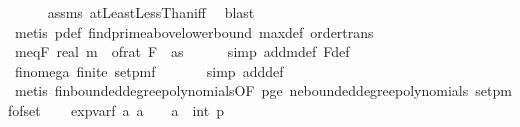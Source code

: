\begin{isabellebody}
\ \ \ \ \isamarkupfalse%
\ assms{\isacharparenleft}{\kern0pt}{}{\isacharparenright}{\kern0pt}\ atLeastLessThan{\isacharunderscore}{\kern0pt}iff\ \isamarkupfalse%
\ blast\isanewline
\ \ \ \ \isamarkupfalse%
\ {\isacharparenleft}{\kern0pt}metis\ p{\isacharunderscore}{\kern0pt}def\ find{\isacharunderscore}{\kern0pt}prime{\isacharunderscore}{\kern0pt}above{\isacharunderscore}{\kern0pt}lower{\isacharunderscore}{\kern0pt}bound\ max{\isacharunderscore}{\kern0pt}def\ order{\isacharunderscore}{\kern0pt}trans{\isacharparenright}{\kern0pt}\isanewline
\isanewline
\ \ \isamarkupfalse%
\ m{\isacharunderscore}{\kern0pt}eq{\isacharunderscore}{\kern0pt}F{\isacharunderscore}{\kern0pt}{}{\isacharcolon}{\kern0pt}\ {\isachardoublequoteopen}real\ m\ {\isacharequal}{\kern0pt}\ of{\isacharunderscore}{\kern0pt}rat\ {\isacharparenleft}{\kern0pt}F\ {}\ as{\isacharparenright}{\kern0pt}{\isachardoublequoteclose}\isanewline
\ \ \ \ \isamarkupfalse%
\ {\isacharparenleft}{\kern0pt}simp\ add{\isacharcolon}{\kern0pt}m{\isacharunderscore}{\kern0pt}def\ F{\isacharunderscore}{\kern0pt}def{\isacharparenright}{\kern0pt}\isanewline
\isanewline
\ \ \isamarkupfalse%
\ fin{\isacharunderscore}{\kern0pt}omega{\isacharunderscore}{\kern0pt}{}{\isacharcolon}{\kern0pt}\ {\isachardoublequoteopen}finite\ {\isacharparenleft}{\kern0pt}set{\isacharunderscore}{\kern0pt}pmf\ {\isasymOmega}\isanewline
\ \ \ \ \isamarkupfalse%
\ {\isacharparenleft}{\kern0pt}simp\ add{\isacharcolon}{\kern0pt}{\isasymOmega}def{\isacharparenright}{\kern0pt}\isanewline
\ \ \ \ \isamarkupfalse%
\ {\isacharparenleft}{\kern0pt}metis\ fin{\isacharunderscore}{\kern0pt}bounded{\isacharunderscore}{\kern0pt}degree{\isacharunderscore}{\kern0pt}polynomials{\isacharbrackleft}{\kern0pt}OF\ p{\isacharunderscore}{\kern0pt}ge{\isacharunderscore}{\kern0pt}{}{\isacharbrackright}{\kern0pt}\ ne{\isacharunderscore}{\kern0pt}bounded{\isacharunderscore}{\kern0pt}degree{\isacharunderscore}{\kern0pt}polynomials\ set{\isacharunderscore}{\kern0pt}pmf{\isacharunderscore}{\kern0pt}of{\isacharunderscore}{\kern0pt}set{\isacharparenright}{\kern0pt}\isanewline
\isanewline
\ \ \isamarkupfalse%
\ exp{\isacharunderscore}{\kern0pt}var{\isacharunderscore}{\kern0pt}f{\isacharcolon}{\kern0pt}\ {\isachardoublequoteopen}{\isasymAnd}a{\isachardot}{\kern0pt}\ a\ {\isasymge}\ {\isacharminus}{\kern0pt}{}\ {\isasymLongrightarrow}\ a\ {\isacharless}{\kern0pt}\ int\ p\ {\isasymLongrightarrow}\ \isanewline

\end{isabellebody}
